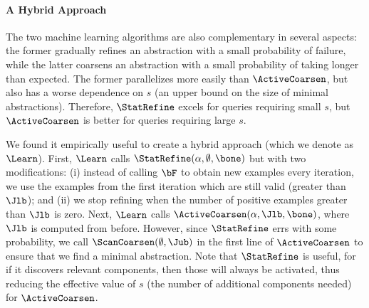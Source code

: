 \paragraph{A Hybrid Approach}

The two machine learning algorithms are also complementary in several aspects:
the former gradually refines an abstraction with a small probability of failure,
while the latter coarsens an abstraction with a small probability of taking longer than expected.
The former parallelizes more easily than $\ActiveCoarsen$,
but also has a worse dependence on $s$ (an upper bound on the size of minimal abstractions).
Therefore, $\StatRefine$ excels for queries requiring small $s$,
but $\ActiveCoarsen$ is better for queries requiring large $s$.

We found it empirically useful to create a hybrid approach (which we denote as $\Learn$).
First, $\Learn$ calls $\StatRefine(\alpha, \emptyset, \bone)$ but with two modifications:
(i) instead of calling $\bF$ to obtain new examples every iteration, we
use the examples from the first iteration which are still valid (greater than $\Jlb$);
and (ii) we stop refining when the number of positive examples greater than $\Jlb$ is zero.
Next, $\Learn$ calls $\ActiveCoarsen(\alpha, \Jlb, \bone)$, where $\Jlb$ is computed from before.
However, since $\StatRefine$ errs with some probability, we call
$\ScanCoarsen(\emptyset, \Jub)$ in the first line of $\ActiveCoarsen$ to ensure
that we find a minimal abstraction.
Note that $\StatRefine$ is useful, for if it discovers relevant components,
then those will always be activated, thus reducing the effective value of $s$
(the number of additional components needed) for $\ActiveCoarsen$.
